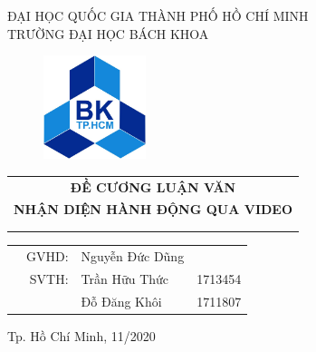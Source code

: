 \begin{titlepage}
    \begin{center} \large
        ĐẠI HỌC QUỐC GIA THÀNH PHỐ HỒ CHÍ MINH \\
        TRƯỜNG ĐẠI HỌC BÁCH KHOA
    \end{center}

    \vspace{1.5cm}

    \begin{figure}[h!]
        \begin{center}
            \includegraphics[width=3cm]{asset/image/hcmut-logo.jpg}
        \end{center}
    \end{figure}

    \vspace{1cm}

    \begin{center}
        \begin{tabular}{c}
            {\bf \large ĐỀ CƯƠNG LUẬN VĂN}             \\

            {\bf \large NHẬN DIỆN HÀNH ĐỘNG QUA VIDEO} \\

            \\ \hline \hline \\
        \end{tabular}
    \end{center}

    \vspace{1cm}

    \begin{table}[h]
        \begin{tabular}{rrll}
            \hspace{2.8cm}
             & \large  GVHD:
             & \large Nguyễn Đức Dũng &                                      \\
             & \large  SVTH:
             & \large Trần Hữu Thức   & \large 1713454                       \\
             &                        & \large Đỗ Đăng Khôi & \large 1711807 \\
        \end{tabular}
    \end{table}

    \vspace{2cm}

    \begin{center}
        {\large Tp. Hồ Chí Minh, 11/2020}
    \end{center}
\end{titlepage}
